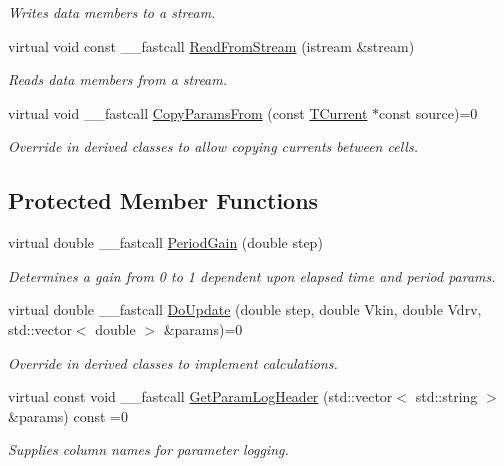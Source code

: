 \begin{DoxyCompactItemize}
\begin{DoxyCompactList}\small\item\em Writes data members to a stream. \end{DoxyCompactList}\item 
\hypertarget{class_t_current_acf46ecef416e6d98cfdfe3e257664ca2}{virtual void const \+\_\+\+\_\+fastcall \hyperlink{class_t_current_acf46ecef416e6d98cfdfe3e257664ca2}{Read\+From\+Stream} (istream \&stream)}\label{class_t_current_acf46ecef416e6d98cfdfe3e257664ca2}

\begin{DoxyCompactList}\small\item\em Reads data members from a stream. \end{DoxyCompactList}\item 
virtual void \+\_\+\+\_\+fastcall \hyperlink{class_t_current_aebcea46c23969845718fca06e1504a9d}{Copy\+Params\+From} (const \hyperlink{class_t_current}{T\+Current} $\ast$const source)=0
\begin{DoxyCompactList}\small\item\em Override in derived classes to allow copying currents between cells. \end{DoxyCompactList}\end{DoxyCompactItemize}
\subsection*{Protected Member Functions}
\begin{DoxyCompactItemize}
\item 
virtual double \+\_\+\+\_\+fastcall \hyperlink{class_t_current_a6b07a3089608de995a40899e517a6bbf}{Period\+Gain} (double step)
\begin{DoxyCompactList}\small\item\em Determines a gain from 0 to 1 dependent upon elapsed time and period params. \end{DoxyCompactList}\item 
virtual double \+\_\+\+\_\+fastcall \hyperlink{class_t_current_a36d89025eb424f6905fef945c9ae4fa7}{Do\+Update} (double step, double Vkin, double Vdrv, std\+::vector$<$ double $>$ \&params)=0
\begin{DoxyCompactList}\small\item\em Override in derived classes to implement calculations. \end{DoxyCompactList}\item 
virtual const void \+\_\+\+\_\+fastcall \hyperlink{class_t_current_ab49cb51723efade5eec00fa78fad7ad8}{Get\+Param\+Log\+Header} (std\+::vector$<$ std\+::string $>$ \&params) const =0
\begin{DoxyCompactList}\small\item\em Supplies column names for parameter logging. \end{DoxyCompactList}\end{DoxyCompactItemize}
